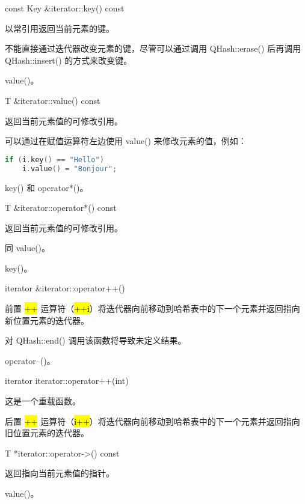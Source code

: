 const Key \&iterator::key() const

以常引用返回当前元素的键。

不能直接通过迭代器改变元素的键，尽管可以通过调用 QHash::erase() 后再调用 QHash::insert() 的方式来改变键。


\begin{notice}[另请参阅]
 value()。
\end{notice}

T \&iterator::value() const

返回当前元素值的可修改引用。

可以通过在赋值运算符左边使用 value() 来修改元素的值，例如：

\begin{lstlisting}[language=C++]
if (i.key() == "Hello")
    i.value() = "Bonjour";
\end{lstlisting}


\begin{notice}[另请参阅]
key() 和 operator*()。
\end{notice}

T \&iterator::operator*() const

返回当前元素值的可修改引用。

同 value()。


\begin{notice}[另请参阅]
key()。
\end{notice}


iterator \&iterator::operator++()

前置 \hl{++} 运算符（\hl{++i}）将迭代器向前移动到哈希表中的下一个元素并返回指向新位置元素的迭代器。

对 QHash::end() 调用该函数将导致未定义结果。


\begin{notice}[另请参阅]
operator--()。
\end{notice}

iterator iterator::operator++(int)

这是一个重载函数。

后置 \hl{++} 运算符（\hl{i++}）将迭代器向前移动到哈希表中的下一个元素并返回指向旧位置元素的迭代器。

T *iterator::operator->() const

返回指向当前元素值的指针。

\begin{notice}[另请参阅]
 value()。
\end{notice}
